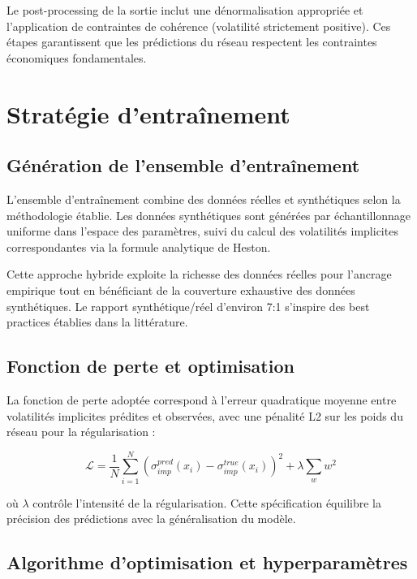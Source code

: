 Le post-processing de la sortie inclut une dénormalisation appropriée et l'application de contraintes de cohérence (volatilité strictement positive). Ces étapes garantissent que les prédictions du réseau respectent les contraintes économiques fondamentales.

\section{Stratégie d'entraînement}

\subsection{Génération de l'ensemble d'entraînement}

L'ensemble d'entraînement combine des données réelles et synthétiques selon la méthodologie établie. Les données synthétiques sont générées par échantillonnage uniforme dans l'espace des paramètres, suivi du calcul des volatilités implicites correspondantes via la formule analytique de Heston.

Cette approche hybride exploite la richesse des données réelles pour l'ancrage empirique tout en bénéficiant de la couverture exhaustive des données synthétiques. Le rapport synthétique/réel d'environ 7:1 s'inspire des best practices établies dans la littérature.

\subsection{Fonction de perte et optimisation}

La fonction de perte adoptée correspond à l'erreur quadratique moyenne entre volatilités implicites prédites et observées, avec une pénalité L2 sur les poids du réseau pour la régularisation :

\begin{equation}
\mathcal{L} = \frac{1}{N}\sum_{i=1}^{N} (\sigma_{imp}^{pred}(x_i) - \sigma_{imp}^{true}(x_i))^2 + \lambda \sum_{w} w^2
\end{equation}

où $\lambda$ contrôle l'intensité de la régularisation. Cette spécification équilibre la précision des prédictions avec la généralisation du modèle.

\subsection{Algorithme d'optimisation et hyperparamètres}


